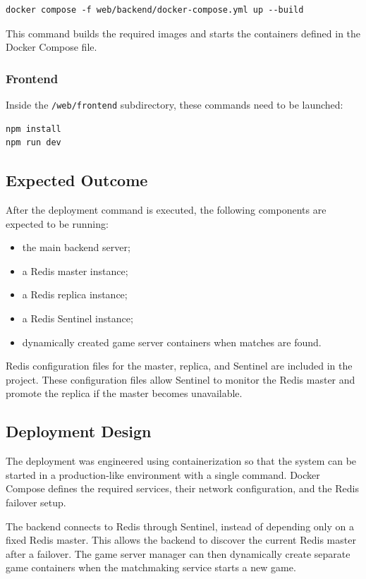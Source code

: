 \documentclass{scrartcl}
\begin{document}
\begin{verbatim}
docker compose -f web/backend/docker-compose.yml up --build
\end{verbatim}

This command builds the required images and starts the containers defined in the Docker Compose file.

\subsubsection{Frontend}

Inside the \texttt{/web/frontend} subdirectory, these commands need to be launched:
\begin{verbatim}
npm install
npm run dev
\end{verbatim}

\subsection{Expected Outcome}

After the deployment command is executed, the following components are expected to be running:

\begin{itemize}
    \item the main backend server;
    \item a Redis master instance;
    \item a Redis replica instance;
    \item a Redis Sentinel instance;
    \item dynamically created game server containers when matches are found.
\end{itemize}

Redis configuration files for the master, replica, and Sentinel are included in the project. These configuration files allow Sentinel to monitor the Redis master and promote the replica if the master becomes unavailable.

\subsection{Deployment Design}

The deployment was engineered using containerization so that the system can be started in a production-like environment with a single command. Docker Compose defines the required services, their network configuration, and the Redis failover setup.

The backend connects to Redis through Sentinel, instead of depending only on a fixed Redis master. This allows the backend to discover the current Redis master after a failover. The game server manager can then dynamically create separate game containers when the matchmaking service starts a new game.
\end{document}
